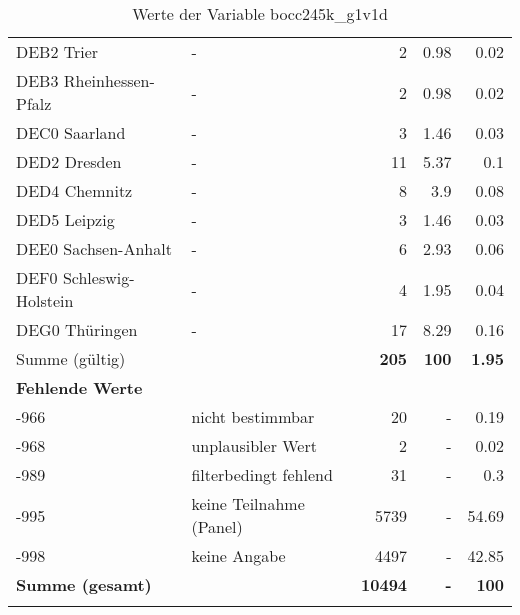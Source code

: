 \begin{longtable}{Xlrrr}
        \multicolumn{1}{X}{DEB2 Trier} & - & \num{2} & \num[round-mode=places,round-precision=2]{0.98} & \num[round-mode=places,round-precision=2]{0.02} \\
        \multicolumn{1}{X}{DEB3 Rheinhessen-Pfalz} & - & \num{2} & \num[round-mode=places,round-precision=2]{0.98} & \num[round-mode=places,round-precision=2]{0.02} \\
        \multicolumn{1}{X}{DEC0 Saarland} & - & \num{3} & \num[round-mode=places,round-precision=2]{1.46} & \num[round-mode=places,round-precision=2]{0.03} \\
        \multicolumn{1}{X}{DED2 Dresden} & - & \num{11} & \num[round-mode=places,round-precision=2]{5.37} & \num[round-mode=places,round-precision=2]{0.1} \\
        \multicolumn{1}{X}{DED4 Chemnitz} & - & \num{8} & \num[round-mode=places,round-precision=2]{3.9} & \num[round-mode=places,round-precision=2]{0.08} \\
        \multicolumn{1}{X}{DED5 Leipzig} & - & \num{3} & \num[round-mode=places,round-precision=2]{1.46} & \num[round-mode=places,round-precision=2]{0.03} \\
        \multicolumn{1}{X}{DEE0 Sachsen-Anhalt} & - & \num{6} & \num[round-mode=places,round-precision=2]{2.93} & \num[round-mode=places,round-precision=2]{0.06} \\
        \multicolumn{1}{X}{DEF0 Schleswig-Holstein} & - & \num{4} & \num[round-mode=places,round-precision=2]{1.95} & \num[round-mode=places,round-precision=2]{0.04} \\
        \multicolumn{1}{X}{DEG0 Thüringen} & - & \num{17} & \num[round-mode=places,round-precision=2]{8.29} & \num[round-mode=places,round-precision=2]{0.16} \\
     \midrule
      \multicolumn{2}{l}{Summe (gültig)} & \textbf{\num{205}} &
      \textbf{\num{100}} &
         \textbf{\num[round-mode=places,round-precision=2]{1.95}} \\
     \multicolumn{5}{l}{\textbf{Fehlende Werte}}\\
       -966 & nicht bestimmbar & \num{20} & - & \num[round-mode=places,round-precision=2]{0.19} \\

       -968 & unplausibler Wert & \num{2} & - & \num[round-mode=places,round-precision=2]{0.02} \\

       -989 & filterbedingt fehlend & \num{31} & - & \num[round-mode=places,round-precision=2]{0.3} \\

       -995 & keine Teilnahme (Panel) & \num{5739} & - & \num[round-mode=places,round-precision=2]{54.69} \\

       -998 & keine Angabe & \num{4497} & - & \num[round-mode=places,round-precision=2]{42.85} \\

     \midrule
     \multicolumn{2}{l}{\textbf{Summe (gesamt)}} & \textbf{\num{10494}} & \textbf{-} & \textbf{\num{100}} \\
     \bottomrule
     \caption{Werte der Variable bocc245k\_g1v1d}
     \end{longtable}
     
